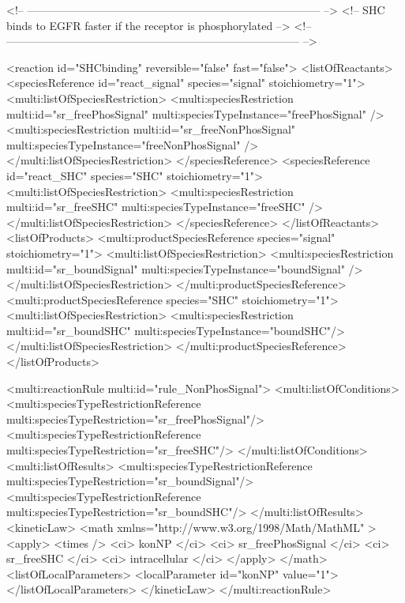\begin{example}
<!-- -------------------------------------------------------------------------------- -->
<!-- SHC binds to EGFR faster if the receptor is phosphorylated                       -->
<!-- -------------------------------------------------------------------------------- -->

       <reaction id="SHCbinding" reversible="false" fast="false"> 
        <listOfReactants>
          <speciesReference id="react_signal" species="signal" stoichiometry="1">
            <multi:listOfSpeciesRestriction>
              <multi:speciesRestriction multi:id="sr_freePhosSignal" 
                                        multi:speciesTypeInstance="freePhosSignal" />
              <multi:speciesRestriction multi:id="sr_freeNonPhosSignal" 
                                        multi:speciesTypeInstance="freeNonPhosSignal" />
            </multi:listOfSpeciesRestriction>
          </speciesReference>
          <speciesReference id="react_SHC" species="SHC" stoichiometry="1">
            <multi:listOfSpeciesRestriction>
              <multi:speciesRestriction multi:id="sr_freeSHC" 
                                        multi:speciesTypeInstance="freeSHC" />
            </multi:listOfSpeciesRestriction>
          </speciesReference>
        </listOfReactants>
        <listOfProducts>
          <multi:productSpeciesReference species="signal" stoichiometry="1">
            <multi:listOfSpeciesRestriction>
              <multi:speciesRestriction multi:id="sr_boundSignal" 
                                        multi:speciesTypeInstance="boundSignal" />
            </multi:listOfSpeciesRestriction>
          </multi:productSpeciesReference>
          <multi:productSpeciesReference species="SHC" stoichiometry="1">
            <multi:listOfSpeciesRestriction>
              <multi:speciesRestriction multi:id="sr_boundSHC" 
                                        multi:speciesTypeInstance="boundSHC"/>
            </multi:listOfSpeciesRestriction>
          </multi:productSpeciesReference>
        </listOfProducts>

        <multi:reactionRule multi:id="rule_NonPhosSignal">
          <multi:listOfConditions>
            <multi:speciesTypeRestrictionReference multi:speciesTypeRestriction="sr_freePhosSignal"/>
            <multi:speciesTypeRestrictionReference multi:speciesTypeRestriction="sr_freeSHC"/>
          </multi:listOfConditions>
          <multi:listOfResults>
            <multi:speciesTypeRestrictionReference multi:speciesTypeRestriction="sr_boundSignal"/>
            <multi:speciesTypeRestrictionReference multi:speciesTypeRestriction="sr_boundSHC"/>
          </multi:listOfResults>
            <kineticLaw>
              <math xmlns="http://www.w3.org/1998/Math/MathML" >
                <apply>
                  <times />
                  <ci> konNP </ci>
                  <ci> sr_freePhosSignal </ci>
                  <ci> sr_freeSHC </ci>
                  <ci> intracellular </ci>
                </apply>
              </math>
              <listOfLocalParameters>
                <localParameter id="konNP" value="1">
              </listOfLocalParameters>
            </kineticLaw>
          </multi:reactionRule>


\end{example}
